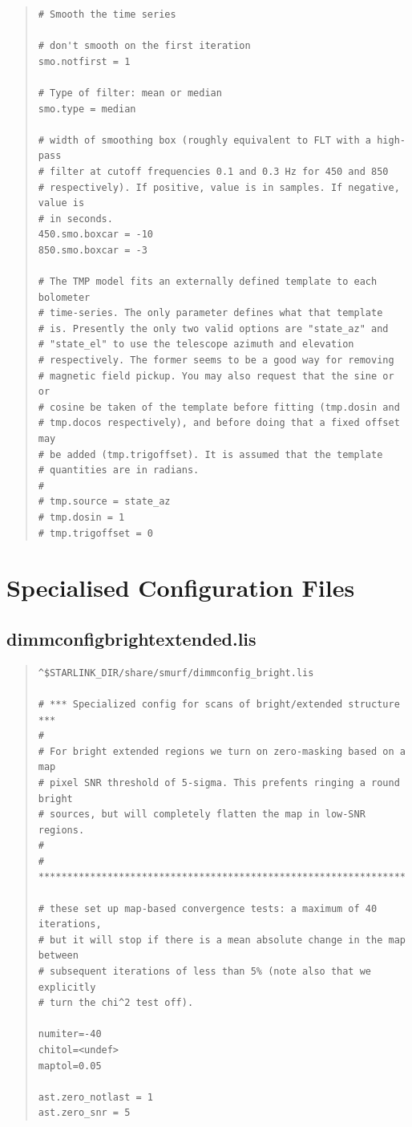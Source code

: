 \documentclass[twoside,11pt]{article}
\newcommand{\xlabel}[1]{}
\renewcommand{\_}{\texttt{\symbol{95}}}
\newenvironment{myquote}{\begin{quote}\begin{small}}{\end{small}\end{quote}}
\begin{document}
\begin{myquote}
\begin{verbatim}
# Smooth the time series

# don't smooth on the first iteration
smo.notfirst = 1

# Type of filter: mean or median
smo.type = median

# width of smoothing box (roughly equivalent to FLT with a high-pass
# filter at cutoff frequencies 0.1 and 0.3 Hz for 450 and 850
# respectively). If positive, value is in samples. If negative, value is
# in seconds.
450.smo.boxcar = -10
850.smo.boxcar = -3

# The TMP model fits an externally defined template to each bolometer
# time-series. The only parameter defines what that template
# is. Presently the only two valid options are "state_az" and
# "state_el" to use the telescope azimuth and elevation
# respectively. The former seems to be a good way for removing
# magnetic field pickup. You may also request that the sine or or
# cosine be taken of the template before fitting (tmp.dosin and
# tmp.docos respectively), and before doing that a fixed offset may
# be added (tmp.trigoffset). It is assumed that the template
# quantities are in radians.
#
# tmp.source = state_az
# tmp.dosin = 1
# tmp.trigoffset = 0

\end{verbatim}
\end{myquote}


\section{\xlabel{special}Specialised Configuration Files}
\label{app:special}

\subsection{dimmconfig\_bright\_extended.lis}
\begin{myquote}
\begin{verbatim}
^$STARLINK_DIR/share/smurf/dimmconfig_bright.lis

# *** Specialized config for scans of bright/extended structure ***
#
# For bright extended regions we turn on zero-masking based on a map
# pixel SNR threshold of 5-sigma. This prefents ringing a round bright
# sources, but will completely flatten the map in low-SNR regions.
#
# ****************************************************************

# these set up map-based convergence tests: a maximum of 40 iterations,
# but it will stop if there is a mean absolute change in the map between
# subsequent iterations of less than 5% (note also that we explicitly
# turn the chi^2 test off).

numiter=-40
chitol=<undef>
maptol=0.05

ast.zero_notlast = 1
ast.zero_snr = 5
\end{verbatim}
\end{myquote}
\end{document}
